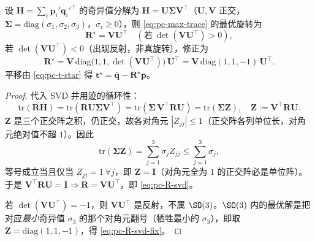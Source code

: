 \begin{theorem}\label{thm:pc-svd}
设 $\mathbf{H}=\sum_i\mathbf{p}_i'\mathbf{q}_i'^\top$ 的奇异值分解为 $\mathbf{H}=\mathbf{U}\boldsymbol{\Sigma}\mathbf{V}^\top$（$\mathbf{U},\mathbf{V}$ 正交，$\boldsymbol{\Sigma}=\mathrm{diag}(\sigma_1,\sigma_2,\sigma_3)$，$\sigma_i\ge0$），则 \cref{eq:pc-max-trace} 的最优旋转为
\begin{equation}
  \mathbf{R}^\star=\mathbf{V}\mathbf{U}^\top\quad(\text{若}\ \det(\mathbf{V}\mathbf{U}^\top)>0),
  \label{eq:pc-R-svd}
\end{equation}
若 $\det(\mathbf{V}\mathbf{U}^\top)<0$（出现反射，非真旋转），修正为
\begin{equation}
  \mathbf{R}^\star=\mathbf{V}\,\mathrm{diag}\!\big(1,1,\det(\mathbf{V}\mathbf{U}^\top)\big)\,\mathbf{U}^\top
  =\mathbf{V}\,\mathrm{diag}(1,1,-1)\,\mathbf{U}^\top.
  \label{eq:pc-R-svd-fix}
\end{equation}
平移由 \cref{eq:pc-t-star} 得 $\mathbf{t}^\star=\bar{\mathbf{q}}-\mathbf{R}^\star\bar{\mathbf{p}}$。
\end{theorem}

\begin{proof}
代入 SVD 并用迹的循环性：
\begin{equation}
  \mathrm{tr}(\mathbf{R}\mathbf{H})=\mathrm{tr}(\mathbf{R}\mathbf{U}\boldsymbol{\Sigma}\mathbf{V}^\top)
  =\mathrm{tr}(\boldsymbol{\Sigma}\,\mathbf{V}^\top\mathbf{R}\mathbf{U})=\mathrm{tr}(\boldsymbol{\Sigma}\mathbf{Z}),\quad \mathbf{Z}:=\mathbf{V}^\top\mathbf{R}\mathbf{U}.
\end{equation}
$\mathbf{Z}$ 是三个正交阵之积，仍正交，故各对角元 $|Z_{jj}|\le1$（正交阵各列单位长，对角元绝对值不超 $1$）。因此
\begin{equation}
  \mathrm{tr}(\boldsymbol{\Sigma}\mathbf{Z})=\sum_{j=1}^{3}\sigma_j Z_{jj}\le\sum_{j=1}^{3}\sigma_j,
\end{equation}
等号成立当且仅当 $Z_{jj}=1\ \forall j$，即 $\mathbf{Z}=\mathbf{I}$（对角元全为 $1$ 的正交阵必是单位阵）。于是 $\mathbf{V}^\top\mathbf{R}\mathbf{U}=\mathbf{I}\Rightarrow\mathbf{R}=\mathbf{V}\mathbf{U}^\top$，即 \cref{eq:pc-R-svd}。

若 $\det(\mathbf{V}\mathbf{U}^\top)=-1$，则 $\mathbf{V}\mathbf{U}^\top$ 是反射，不属 $\SO(3)$。$\SO(3)$ 内的最优解是把对应\emph{最小}奇异值 $\sigma_3$ 的那个对角元翻号（牺牲最小的 $\sigma_3$），即取 $\mathbf{Z}=\mathrm{diag}(1,1,-1)$，得 \cref{eq:pc-R-svd-fix}。
\end{proof}

